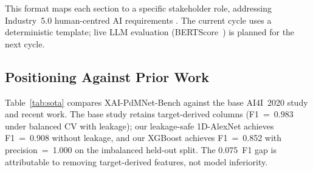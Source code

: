 \documentclass[sensors,article,submit,pdftex,moreauthors]{Definitions/mdpi}
\renewcommand{\arraystretch}{1.12}
\begin{document}
This format maps each section to a specific stakeholder role,
addressing Industry~5.0 human-centred AI requirements
\citep{ref-llm-maintenance2025}. The current cycle uses a
deterministic template; live LLM evaluation
(BERTScore~\citep{ref-bertscore2020}) is planned for the next cycle.

\subsection{Positioning Against Prior Work}
\label{sec:sota}

Table~\ref{tab:sota} compares XAI-PdMNet-Bench against the base
AI4I~2020 study and recent work. The base study
\citep{ref-base-ileri2024} retains target-derived columns (F1~=~0.983
under balanced CV with leakage); our leakage-safe 1D-AlexNet achieves
F1~=~0.908 without leakage, and our XGBoost achieves F1~=~0.852 with
precision~=~1.000 on the imbalanced held-out split. The 0.075~F1 gap
is attributable to removing target-derived features, not model
inferiority.

\begin{table}[H]
\caption{Comparison with prior work. $\dagger$ = data leakage. $^*$ = balanced CV. $^\S$ = template-based; live LLM evaluation is future work.\label{tab:sota}}
\centering
\scriptsize
\setlength{\tabcolsep}{2pt}
\renewcommand{\arraystretch}{1.12}
%
\end{table}
\end{document}
